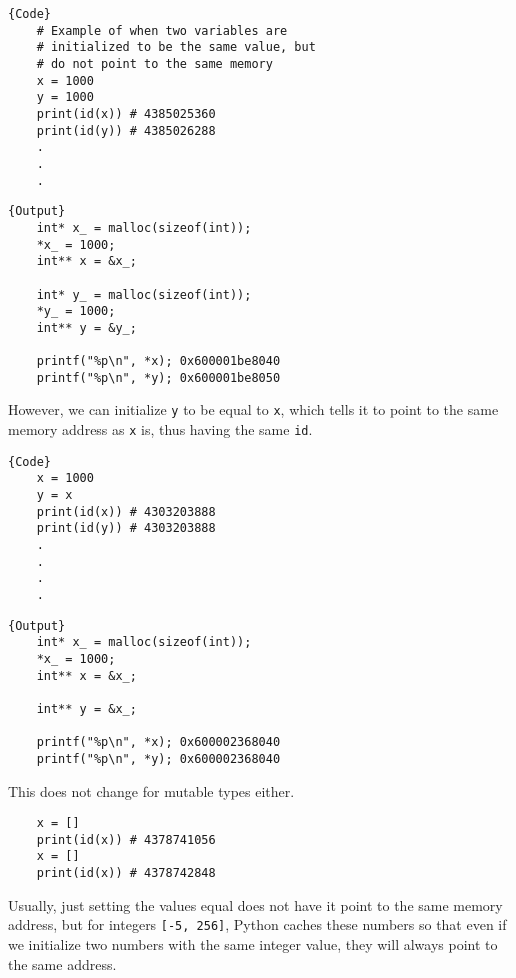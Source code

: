   \noindent\begin{minipage}{.5\textwidth}
  \begin{lstlisting}[]{Code}
    # Example of when two variables are 
    # initialized to be the same value, but 
    # do not point to the same memory
    x = 1000
    y = 1000
    print(id(x)) # 4385025360
    print(id(y)) # 4385026288 
    .
    .
    .
  \end{lstlisting}
  \end{minipage}
  \hfill
  \begin{minipage}{.49\textwidth}
  \begin{lstlisting}[]{Output}
    int* x_ = malloc(sizeof(int)); 
    *x_ = 1000; 
    int** x = &x_; 

    int* y_ = malloc(sizeof(int)); 
    *y_ = 1000; 
    int** y = &y_; 

    printf("%p\n", *x); 0x600001be8040 
    printf("%p\n", *y); 0x600001be8050 
  \end{lstlisting}
  \end{minipage}

  However, we can initialize \texttt{y} to be equal to \texttt{x}, which tells it to point to the same memory address as \texttt{x} is, thus having the same \texttt{id}. 

  \noindent\begin{minipage}{.5\textwidth}
  \begin{lstlisting}[]{Code}
    x = 1000 
    y = x 
    print(id(x)) # 4303203888 
    print(id(y)) # 4303203888 
    .
    .
    .
    .
  \end{lstlisting}
  \end{minipage}
  \hfill
  \begin{minipage}{.49\textwidth}
  \begin{lstlisting}[]{Output}
    int* x_ = malloc(sizeof(int)); 
    *x_ = 1000; 
    int** x = &x_; 

    int** y = &x_; 

    printf("%p\n", *x); 0x600002368040 
    printf("%p\n", *y); 0x600002368040 
  \end{lstlisting}
  \end{minipage}

  This does not change for mutable types either. 
  \begin{lstlisting}
    x = [] 
    print(id(x)) # 4378741056
    x = [] 
    print(id(x)) # 4378742848
  \end{lstlisting}

  Usually, just setting the values equal does not have it point to the same memory address, but for integers \texttt{[-5, 256]}, Python caches these numbers so that even if we initialize two numbers with the same integer value, they will always point to the same address. 

